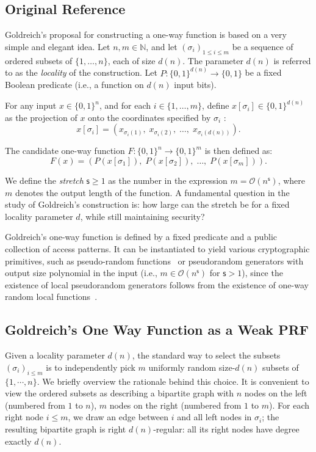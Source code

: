 \documentclass[journal=tosc,submission]{iacrtrans}
\theoremstyle{theorem}
\begin{document}
\subsection{Original Reference}


Goldreich's proposal for constructing a one-way function is based on a very simple and elegant idea. Let $ n, m \in \mathbb{N}$, and let $ (\sigma_i)_{1 \leq i \leq m}$   be a sequence of ordered subsets of $\{1, \dots, n\}$, each of size $ d(n)$. The parameter $d(n)$ is referred to as the \emph{locality} of the construction. Let $P : \{0,1\}^{d(n)} \to \{0,1\}$ be a fixed Boolean predicate  (i.e., a function on $d(n)$ input bits).

For any input $x \in \{0,1\}^n$, and for each $i \in \{1, \dots, m\}$, define  $x[\sigma_i] \in \{0,1\}^{d(n)}$   as the projection of $x$   onto the coordinates specified by $ \sigma_i$  :
\[
x[\sigma_i] = \left( x_{\sigma_i(1)},\; x_{\sigma_i(2)},\; \dots,\; x_{\sigma_i(d(n))} \right).
\]

The candidate one-way function $F: \{0,1\}^n \to \{0,1\}^m$   is then defined as:
\[
F(x) = \left( P(x[\sigma_1]),\; P(x[\sigma_2]),\; \dots,\; P(x[\sigma_m]) \right).
\]

We define the \emph{stretch} $\mathsf{s} \geq 1$ as the number in the expression  $m = \mathcal{O}(n^{\mathsf{s}})$, where $m$ denotes the output length of the function. A fundamental question in the study of Goldreich’s construction is: how large can the stretch be for a fixed locality parameter $d$, while still maintaining security?

Goldreich's one-way function is defined by a fixed predicate and a public collection of access patterns. It can be instantiated to yield various cryptographic primitives, such as pseudo-random functions~\cite{TCC:AppRay16b} or pseudorandom generators with output size polynomial in the input (i.e., $m \in \mathcal{O}(n^\mathsf{s})$ for $\mathsf{s} > 1$), since the existence of local pseudorandom generators follows from the existence of one-way random local functions~\cite{STOC:Applebaum12}.


\subsection{Goldreich's One Way Function as a Weak PRF}

Given a locality parameter $d(n)$, the standard way to select the subsets $(\sigma_i)_{i\leq m}$ is to independently pick $m$ uniformly random size-$d(n)$ subsets of $\{1,\cdots, n\}$. We briefly overview the rationale behind this choice. It is convenient to view the ordered subsets as describing a bipartite graph with $n$ nodes on the left (numbered from $1$ to $n$), $m$ nodes on the right (numbered from $1$ to $m$). For each right node $i \leq m$, we draw an edge between $i$ and all left nodes in $\sigma_i$; the resulting bipartite graph is right $d(n)$-regular: all its right nodes have degree exactly $d(n)$. 
\end{document}

